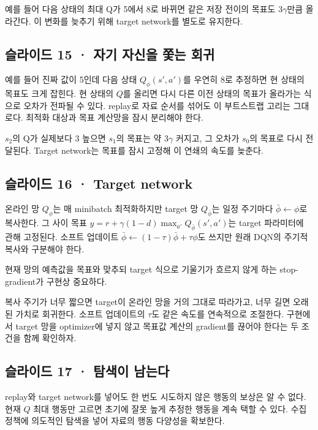 \documentclass[11pt,a4paper]{article}
\begin{document}
예를 들어 다음 상태의 최대 Q가 5에서 8로 바뀌면 같은 저장 전이의 목표도 $3\gamma$만큼 올라간다. 이 변화를 늦추기 위해 target network를 별도로 유지한다.\par

\subsection{슬라이드 15 · 자기 자신을 쫓는 회귀}

예를 들어 진짜 값이 5인데 다음 상태 $Q_\phi(s',a')$를 우연히 8로 추정하면 현 상태의 목표도 크게 잡힌다. 현 상태의 $Q$를 올리면 다시 다른 이전 상태의 목표가 올라가는 식으로 오차가 전파될 수 있다. replay로 자료 순서를 섞어도 이 부트스트랩 고리는 그대로다. 최적화 대상과 목표 계산망을 잠시 분리해야 한다.\par

$s_2$의 Q가 실제보다 3 높으면 $s_1$의 목표는 약 $3\gamma$ 커지고, 그 오차가 $s_0$의 목표로 다시 전달된다. Target network는 목표를 잠시 고정해 이 연쇄의 속도를 늦춘다.\par

\subsection{슬라이드 16 · Target network}

온라인 망 $Q_\phi$는 매 minibatch 최적화하지만 target 망 $Q_{\bar\phi}$는 일정 주기마다 $\bar\phi\leftarrow\phi$로 복사한다. 그 사이 목표 $y=r+\gamma(1-d)\max_{a'}Q_{\bar\phi}(s',a')$는 target 파라미터에 관해 고정된다. 소프트 업데이트 $\bar\phi\leftarrow(1-\tau)\bar\phi+\tau\phi$도 쓰지만 원래 DQN의 주기적 복사와 구분해야 한다.\par

현재 망의 예측값을 목표와 맞추되 target 식으로 기울기가 흐르지 않게 하는 stop-gradient가 구현상 중요하다.\par

복사 주기가 너무 짧으면 target이 온라인 망을 거의 그대로 따라가고, 너무 길면 오래된 가치로 회귀한다. 소프트 업데이트의 $\tau$도 같은 속도를 연속적으로 조절한다. 구현에서 target 망을 optimizer에 넣지 않고 목표값 계산의 gradient를 끊어야 한다는 두 조건을 함께 확인하자.\par

\subsection{슬라이드 17 · 탐색이 남는다}

replay와 target network를 넣어도 한 번도 시도하지 않은 행동의 보상은 알 수 없다. 현재 $Q$ 최대 행동만 고르면 초기에 잘못 높게 추정한 행동을 계속 택할 수 있다. 수집 정책에 의도적인 탐색을 넣어 자료의 행동 다양성을 확보한다.\par
\end{document}
